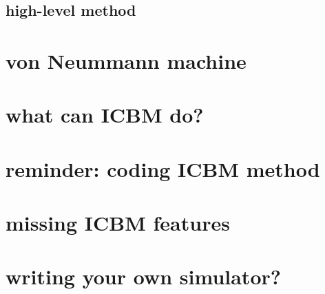 \subsection{high-level method}




\section{von Neummann machine}



\section{what can ICBM do?}




\section{reminder: coding ICBM method}






\section{missing ICBM features}



\section{writing your own simulator?}




